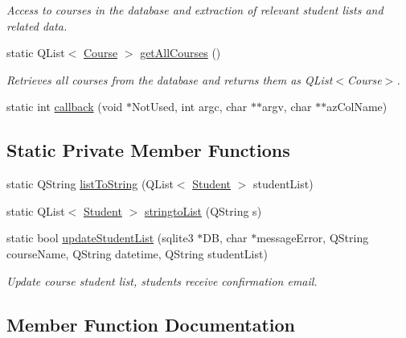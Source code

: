 \begin{DoxyCompactItemize}
\begin{DoxyCompactList}\small\item\em Access to courses in the database and extraction of relevant student lists and related data. \end{DoxyCompactList}\item 
static Q\+List$<$ \hyperlink{struct_course}{Course} $>$ \hyperlink{class_course_d_b_ada1e9df01308d68dacc6a95730517a01}{get\+All\+Courses} ()
\begin{DoxyCompactList}\small\item\em Retrieves all courses from the database and returns them as Q\+List$<$\+Course$>$. \end{DoxyCompactList}\item 
static int \hyperlink{class_course_d_b_a3a1cdfddc732bde349e8fa88afca6d98}{callback} (void $\ast$Not\+Used, int argc, char $\ast$$\ast$argv, char $\ast$$\ast$az\+Col\+Name)
\end{DoxyCompactItemize}
\subsection*{Static Private Member Functions}
\begin{DoxyCompactItemize}
\item 
static Q\+String \hyperlink{class_course_d_b_a6f9bc47831a1289918ccd71f1cdb98ad}{list\+To\+String} (Q\+List$<$ \hyperlink{struct_student}{Student} $>$ student\+List)
\item 
static Q\+List$<$ \hyperlink{struct_student}{Student} $>$ \hyperlink{class_course_d_b_a2b7bc837a8a08c6c6272a1b3e6a4f3cc}{stringto\+List} (Q\+String s)
\item 
static bool \hyperlink{class_course_d_b_a0a71cd964ea94d514a465b11cb65c437}{update\+Student\+List} (sqlite3 $\ast$D\+B, char $\ast$message\+Error, Q\+String course\+Name, Q\+String datetime, Q\+String student\+List)
\begin{DoxyCompactList}\small\item\em Update course student list, students receive confirmation email. \end{DoxyCompactList}\end{DoxyCompactItemize}


\subsection{Member Function Documentation}
\hypertarget{class_course_d_b_a3a1cdfddc732bde349e8fa88afca6d98}{}
